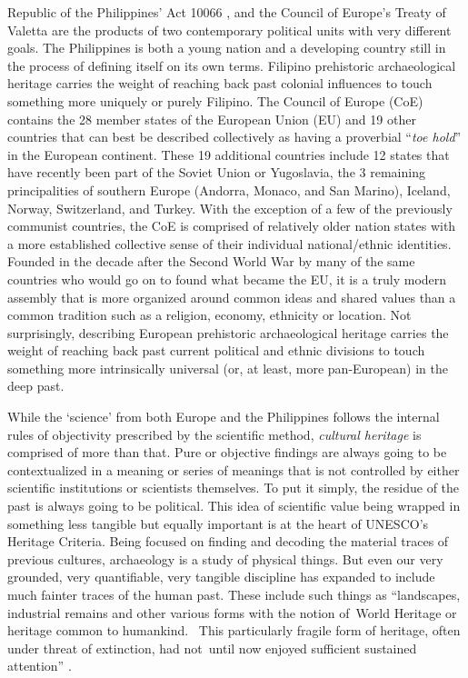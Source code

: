 Republic of the Philippines’ Act 10066 \parencite{RA10066}, and the Council of Europe’s Treaty of Valetta \parencite{Valetta_1992} are the products of two contemporary political units with very different goals. The Philippines is both a young nation and a developing country still in the process of defining itself on its own terms. 
Filipino prehistoric archaeological heritage carries the weight of reaching back past colonial influences to touch something more uniquely or purely Filipino. The Council of Europe (CoE) contains the 28 member states of the European Union (EU) and 19 other countries that can best be described collectively as having a proverbial “\textit{toe hold}” in the European continent. 
These 19 additional countries include 12 states that have recently been part of the Soviet Union or Yugoslavia, the 3 remaining principalities of southern Europe (Andorra, Monaco, and San Marino), Iceland, Norway, Switzerland, and Turkey.  With the exception of a few of the previously communist countries, the CoE is comprised of relatively older nation states with a more established collective sense of their individual national/ethnic identities. Founded in the decade after the Second World War by many of the same countries who would go on to found what became the EU, it is a truly modern assembly that is more organized around common ideas and shared values than a common tradition such as a religion, economy, ethnicity or location. Not surprisingly, describing European prehistoric archaeological heritage carries the weight of reaching back past current political and ethnic divisions to touch something more intrinsically universal (or, at least, more pan-European) in the deep past. 
 
While the ‘science’ from both Europe and the Philippines follows the internal rules of objectivity prescribed by the scientific method, \textit{cultural heritage} is comprised of more than that. Pure or objective findings are always going to be contextualized in a meaning or series of meanings that is not controlled by either scientific institutions or scientists themselves. To put it simply, the residue of the past is always going to be political. This idea of scientific value being wrapped in something less tangible but equally important is at the heart of UNESCO’s Heritage Criteria. Being focused on finding and decoding the material traces of previous cultures, archaeology is a study of physical things. But even our very grounded, very quantifiable, very tangible discipline has expanded to include much fainter traces of the human past. These include such things as “landscapes, industrial remains and other various forms with the notion of World Heritage or heritage common to humankind.  This particularly fragile form of heritage, often under threat of extinction, had not until now enjoyed sufficient sustained attention” \parencite{Cairo_2015}. 


